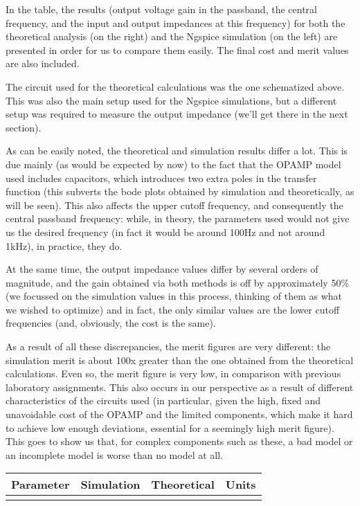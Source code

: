 In the table, the results (output voltage gain in the passband, the central frequency, and the input and output impedances at this frequency) for both the theoretical analysis (on the right) and the Ngspice simulation (on the left) are presented in order for us to compare them easily. The final cost and merit values are also included.\par
The circuit used for the theoretical calculations was the one schematized above. This was also the main setup used for the Ngspice simulations, but a different setup was required to measure the output impedance (we'll get there in the next section).\par
As can be easily noted, the theoretical and simulation results differ a lot. This is due mainly (as would be expected by now) to the fact that the OPAMP model used includes capacitors, which introduces two extra poles in the transfer function (this subverts the bode plots obtained by simulation and theoretically, as will be seen). This also affects the upper cutoff frequency, and consequently the central passband frequency: while, in theory, the parameters used would not give us the desired frequency (in fact it would be around 100Hz and not around 1kHz), in practice, they do. \par
At the same time, the output impedance values differ by several orders of magnitude, and the gain obtained via both methods is off by approximately 50\% (we focussed on the simulation values in this process, thinking of them as what we wished to optimize) and in fact, the only similar values are the lower cutoff frequencies (and, obviously, the cost is the same).\par
As a result of all these discrepancies, the merit figures are very different: the simulation merit is about 100x greater than the one obtained from the theoretical calculations. Even so, the merit figure is very low, in comparison with previous laboratory assignments. This also occurs in our perspective as a result of different characteristics of the circuits used (in particular, given the high, fixed and unavoidable cost of the OPAMP and the limited components, which make it hard to achieve low enough deviations, essential for a seemingly high merit figure). This goes to show us that, for complex components such as these, a bad model or an incomplete model is worse than no model at all.\par

\hfill
 \parbox{1\linewidth}{
  \centering
  \begin{tabular}{|l|l|l|r|}
    \hline    
    {\bf Parameter} & {\bf Simulation} & {\bf Theoretical } & {\bf Units }\\ \hline
    
  \label{tab:results}
  \end{tabular}
  }
  
